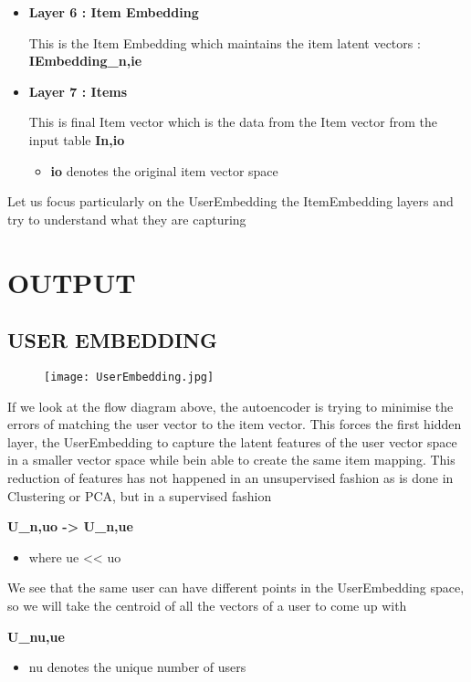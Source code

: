 \documentclass[letterpaper,twocolumn,10pt]{article}
\begin{document}
\begin{itemize}
\item \textbf{Layer 6 : Item Embedding}

This is the Item Embedding which maintains the item latent vectors : \textbf{IEmbedding_{n,ie}}

\item \textbf{Layer 7 : Items}

This is final Item vector which is the data from the Item vector from the input table \textbf{I{n,io}}
\begin{itemize}
\item \textbf{io} denotes the original item vector space
\end{itemize}

\end{itemize}

Let us focus particularly on the UserEmbedding the ItemEmbedding layers and try to understand what they are capturing

\section {OUTPUT}

\subsection {USER EMBEDDING}

\begin{figure}[h!]
\texttt{[image: UserEmbedding.jpg]}
\end{figure}

If we look at the flow diagram above, the autoencoder is trying to minimise the errors of matching the user vector to the item vector. This forces the first hidden layer, the UserEmbedding to capture the latent features of the user vector space in a smaller vector space while bein able to create the same item mapping. This reduction of features has not happened in an unsupervised fashion as is done in Clustering or PCA, but in a supervised fashion


\textbf{U_{n,uo} -> U_{n,ue}  }
\begin{itemize}
\item where ue << uo
\end{itemize}

We see that the same user can have different points in the UserEmbedding space, so we will take the centroid of all the vectors of a user to come up with 

\textbf{U_{nu,ue}}
\begin{itemize}
\item nu denotes the unique number of users
\end{itemize}
\end{document}
